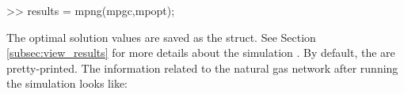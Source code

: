 \begin{Code}
>> results = mpng(mpgc,mpopt);         %
\end{Code}

The optimal solution values are saved as the  struct.  See Section \ref{subsec:view_results} for more details about the simulation . By default, the  are pretty-printed. The information related to the natural gas network after running the simulation looks like:\\

\vspace{-0.3cm}

%			
%			
